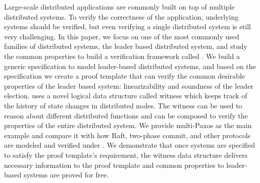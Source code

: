 Large-scale distributed applications are commonly built on top of multiple
distributed systems. To verify the correctness of the application, underlying
systems should be verified, but even verifying a single distributed system is
still very challenging. In this paper, we focus on one of the most commonly
used families of distributed systems, the leader based distributed system, and study the common properties to build a verification framework called \sysname{}.
We build a generic specification to model leader-based distributed systems, and based on
the specification we create a proof template that can verify the common
desirable properties of the leader based system: linearizability and soundness of
the leader election. \sysname{} uses a novel logical data structure called witness which keeps track of the history of state changes in distributed nodes.
The witness can be used to reason about different distributed functions and can
be composed to verify the properties of the entire distributed system. We provide
multi-Paxos as the main example and compare it with
how Raft, two-phase commit, and other protocols are modeled and verified under
\sysname{}. We demonstrate that once systems are specified to satisfy the proof template's requirement, the witness data structure delivers necessary
information to the proof template and common properties to leader-based systems are proved for free. 


